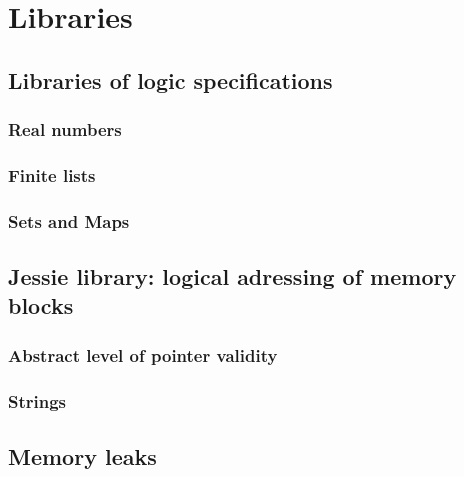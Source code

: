 \chapter{Libraries}
\label{chap:lib}

\section{Libraries of logic specifications}
\label{sec:speclibraries}

\subsection{Real numbers}
\label{sec:libreal}

\subsection{Finite lists}


\subsection{Sets and Maps}

\section{Jessie library: logical adressing of memory blocks}
\label{sec:jessie}

\subsection{Abstract level of pointer validity}

\subsection{Strings}

\experimental

\section{Memory leaks}

\experimental
